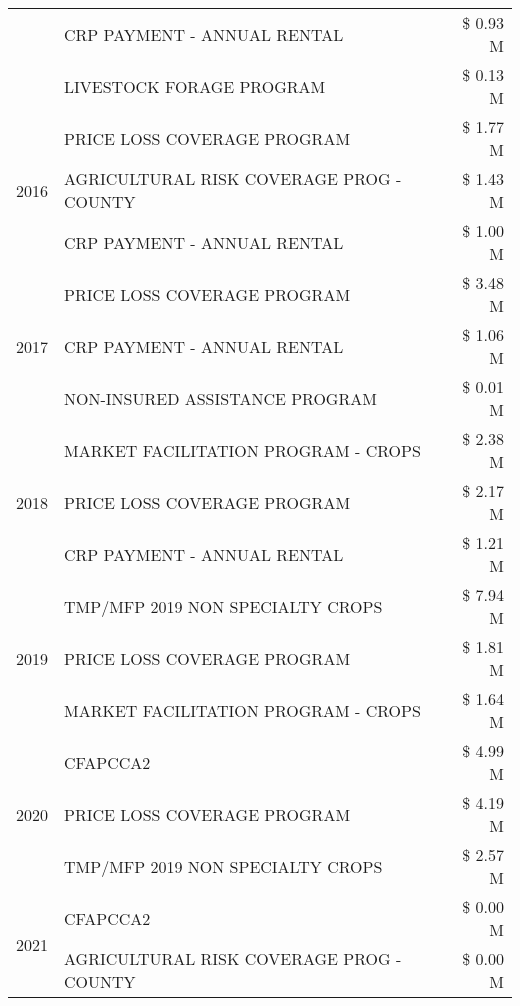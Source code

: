 \begin{tabular}{llr}
 & CRP PAYMENT - ANNUAL RENTAL & \$ 0.93 M \\
 & LIVESTOCK FORAGE PROGRAM & \$ 0.13 M \\
\cline{1-3}
\multirow[t]{3}{*}{2016} & PRICE LOSS COVERAGE PROGRAM & \$ 1.77 M \\
 & AGRICULTURAL RISK COVERAGE PROG - COUNTY & \$ 1.43 M \\
 & CRP PAYMENT - ANNUAL RENTAL & \$ 1.00 M \\
\cline{1-3}
\multirow[t]{3}{*}{2017} & PRICE LOSS COVERAGE PROGRAM & \$ 3.48 M \\
 & CRP PAYMENT - ANNUAL RENTAL & \$ 1.06 M \\
 & NON-INSURED ASSISTANCE PROGRAM & \$ 0.01 M \\
\cline{1-3}
\multirow[t]{3}{*}{2018} & MARKET FACILITATION PROGRAM - CROPS & \$ 2.38 M \\
 & PRICE LOSS COVERAGE PROGRAM & \$ 2.17 M \\
 & CRP PAYMENT - ANNUAL RENTAL & \$ 1.21 M \\
\cline{1-3}
\multirow[t]{3}{*}{2019} & TMP/MFP 2019 NON SPECIALTY CROPS & \$ 7.94 M \\
 & PRICE LOSS COVERAGE PROGRAM & \$ 1.81 M \\
 & MARKET FACILITATION PROGRAM - CROPS & \$ 1.64 M \\
\cline{1-3}
\multirow[t]{3}{*}{2020} & CFAPCCA2 & \$ 4.99 M \\
 & PRICE LOSS COVERAGE PROGRAM & \$ 4.19 M \\
 & TMP/MFP 2019 NON SPECIALTY CROPS & \$ 2.57 M \\
\cline{1-3}
\multirow[t]{2}{*}{2021} & CFAPCCA2 & \$ 0.00 M \\
 & AGRICULTURAL RISK COVERAGE PROG - COUNTY & \$ 0.00 M \\
\cline{1-3}
\bottomrule
\end{tabular}
